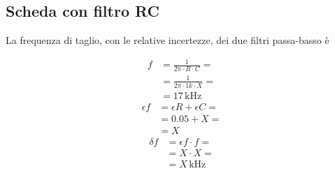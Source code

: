 \documentclass{article}
\begin{document}
		\subsection{Scheda con filtro RC}
			La frequenza di taglio, con le relative incertezze, dei due filtri passa-basso è
			\newline
			\begin{minipage}[t]{0.5\textwidth}
				\begin{equation*}
					\begin{split}
						f &= \frac{1}{2 \pi \cdot R \cdot C} = \\
						  &= \frac{1}{2 \pi \cdot 1k \cdot X} = \\
						  &= 17 \, \mathrm{kHz}
					\end{split}
				\end{equation*}
				\newline
				\begin{equation*}
					\begin{split}
						\epsilon f &= \epsilon R + \epsilon C = \\
								   &= 0.05 + X = \\
								   &= X
					\end{split}
				\end{equation*}
				\newline
				\begin{equation*}
					\begin{split}
						\delta f &= \epsilon f \cdot f = \\
								 &= X \cdot X = \\
								 &= X \, \mathrm{kHz}
					\end{split}
				\end{equation*}
			\end{minipage}
\end{document}
